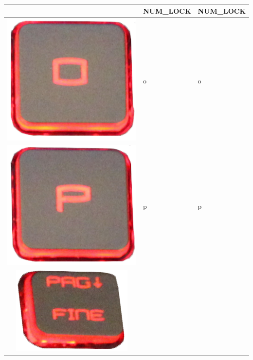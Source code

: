 \begin{longtable}{|cll|}
\begin{minipage}[c]{.4\textwidth}
\vspace{0.2cm}
\end{minipage} & NUM\_LOCK & NUM\_LOCK\\
\hline
\begin{minipage}[c]{.4\textwidth}
\vspace{0.2cm}
\includegraphics[scale=0.08]{Images/KeyMapping/o}
\vspace{0.2cm}
\end{minipage} & o & o\\
\hline
\begin{minipage}[c]{.4\textwidth}
\vspace{0.2cm}
\includegraphics[scale=0.08]{Images/KeyMapping/p}
\vspace{0.2cm}
\end{minipage} & p & p\\
\hline
\begin{minipage}[c]{.4\textwidth}
\vspace{0.2cm}
\includegraphics[scale=0.08]{Images/KeyMapping/PAGE_DOWN}

\end{minipage}
\end{longtable}
